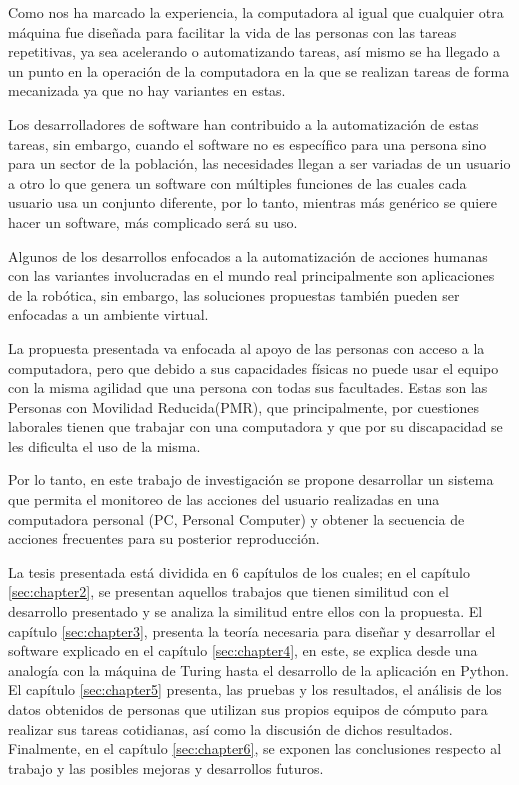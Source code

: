 
Como nos ha marcado la experiencia, la computadora al igual que cualquier
 otra m\'aquina fue dise\~nada para facilitar la vida de las personas con las 
 tareas repetitivas, ya sea acelerando o automatizando tareas, as\'i mismo se 
 ha llegado a un punto en la operaci\'on de la computadora en la que se 
 realizan tareas de forma mecanizada ya que no hay variantes en estas.  

Los desarrolladores de software han contribuido a la automatizaci\'on de 
 estas tareas, sin embargo, cuando el software no es espec\'ifico para una 
 persona sino para un sector de la poblaci\'on, las necesidades llegan a ser 
 variadas de un usuario a otro lo que genera un software con m\'ultiples 
 funciones de las cuales cada usuario usa un conjunto diferente, por lo 
 tanto, mientras m\'as gen\'erico se quiere hacer un software, m\'as 
 complicado ser\'a su uso. 

Algunos de los desarrollos enfocados a la automatizaci\'on de acciones 
 humanas con las variantes involucradas en el mundo real principalmente son  
 aplicaciones de la rob\'otica, sin embargo, las soluciones propuestas 
 tambi\'en pueden ser enfocadas a un ambiente virtual.

La propuesta presentada va enfocada al apoyo de las personas con acceso a la
 computadora, pero que debido a sus capacidades f\'isicas no puede usar el 
 equipo con la misma agilidad que una persona con todas sus facultades. Estas 
 son las Personas con Movilidad Reducida(PMR), que principalmente, por 
 cuestiones laborales tienen que trabajar con una computadora y que por su 
 discapacidad se les dificulta el uso de la misma.

Por lo tanto, en este trabajo de investigaci\'on se propone desarrollar un 
 sistema que permita el monitoreo de las acciones del usuario realizadas en 
 una computadora personal (PC, Personal Computer) y obtener la secuencia de 
 acciones frecuentes para su posterior reproducci\'on.
 
 
La tesis presentada est\'a dividida en 6 cap\'itulos de los cuales; 
 en el cap\'itulo \ref{sec:chapter2}, se presentan aquellos trabajos que 
 tienen similitud con el desarrollo presentado y se analiza la similitud 
 entre ellos con la propuesta. El cap\'itulo \ref{sec:chapter3},  
 presenta la teor\'ia necesaria para dise\~nar y desarrollar el software 
 explicado en el cap\'itulo \ref{sec:chapter4}, en este, se explica desde una 
 analog\'ia con la m\'aquina de Turing hasta el desarrollo de la aplicaci\'on 
 en Python. El cap\'itulo \ref{sec:chapter5} presenta, las pruebas y los 
 resultados, el an\'alisis de los datos obtenidos de personas que utilizan 
 sus propios equipos de c\'omputo para realizar sus tareas cotidianas, as\'i 
 como la discusi\'on de dichos resultados. Finalmente, en el cap\'itulo 
 \ref{sec:chapter6}, se exponen las conclusiones respecto al trabajo y las 
 posibles mejoras y desarrollos futuros.